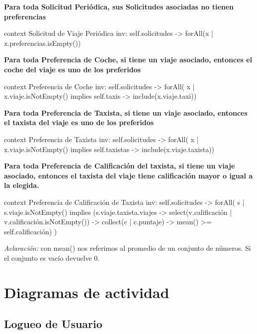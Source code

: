 \documentclass[a4paper, 10pt, twoside]{article}
\newenvironment{ocl}[1]
  {
    \textbf{#1}
    \verbatim
  }{
    \endverbatim
  }
\begin{document}
\begin{ocl}{Para toda Solicitud Periódica, sus Solicitudes asociadas no tienen preferencias}
 context Solicitud de Viaje Periódica
  inv: self.solicitudes -> forAll(x | x.preferencias.isEmpty())
\end{ocl} %
 
  
 
\begin{ocl}{Para toda Preferencia de Coche, si tiene un viaje asociado, entonces el coche del viaje es uno de los preferidos}
  context Preferencia de Coche
  inv: self.solicitudes -> forAll( x | x.viaje.isNotEmpty() implies 
       self.taxis -> include(x.viaje.taxi))
\end{ocl}


\begin{ocl}{Para toda Preferencia de Taxista, si tiene un viaje asociado, entonces el taxista del viaje es uno de los preferidos}
  context Preferencia de Taxista
  inv: self.solicitudes -> forAll( x | x.viaje.isNotEmpty() implies 
       self.taxistas -> include(x.viaje.taxista))
\end{ocl}


\begin{ocl}{Para toda Preferencia de Calificación del taxista, si tiene un viaje asociado, entonces el taxista del viaje tiene calificación mayor o igual a la elegida.}
  context Preferencia de Calificación de Taxista
  inv: self.solicitudes -> forAll( s | s.viaje.isNotEmpty() implies 
       (s.viaje.taxista.viajes -> select(v.calificación | v.calificación.isNotEmpty()) ->
       collect(c | c.puntaje) -> mean() >= self.calificación) )
\end{ocl}

\emph{Aclaración:} con mean() nos referimos al promedio de un conjunto de números. Si el conjunto es vacío devuelve 0.



\section{Diagramas de actividad}

\subsection{Logueo de Usuario}
\label{sec:da-logueo-de-usuario}
\end{document}

